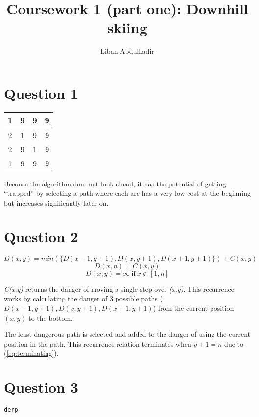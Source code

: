 \documentclass{article}
\begin{document}
\title{Coursework 1 (part one): Downhill skiing}
\author{Liban Abdulkadir}

\maketitle

\section*{Question 1}
\begin{center}
    \begin{tabular}{| c | c | c | c | }
    \hline
    1 & 9 & 9 & 9 \\ \hline
    2 & 1 & 9 & 9 \\ \hline
    2 & 9 & 1 & 9 \\ \hline
    1 & 9 & 9 & 9 \\ \hline
    \end{tabular}
\end{center}
Because the algorithm does not look ahead, it has the potential of getting “trapped” by selecting a path where each arc has a very low cost at the beginning but increases significantly later on.
\section*{Question 2}
\begin{equation}D(x,y) = min(\{D(x-1,y+1),D(x,y+1),D(x+1,y+1)\}) + C(x,y)\end{equation}
\begin{equation}D(x,n) = C(x,y)\label{eq:terminating}\end{equation}
\begin{equation}D(x,y) = \infty\;\text{if}\: x \notin [1,n]\end{equation}

\emph{C(x,y)} returns the danger of moving a single step over \emph{(x,y)}.
This recurrence works by calculating the danger of 3 possible paths 
(\begin{math}D(x-1,y+1), D(x,y+1), D(x+1,y+1)\end{math}) from the current position 
\begin{math}(x,y)\end{math} to the bottom.

The least dangerous path is selected and added to the danger of using the current position in the path.
This recurrence relation terminates when \begin{math}y+1 = n\end{math} due to (\ref{eq:terminating}).

\section*{Question 3}
\begin{lstlisting}
derp
\end{lstlisting}
\end{document}
